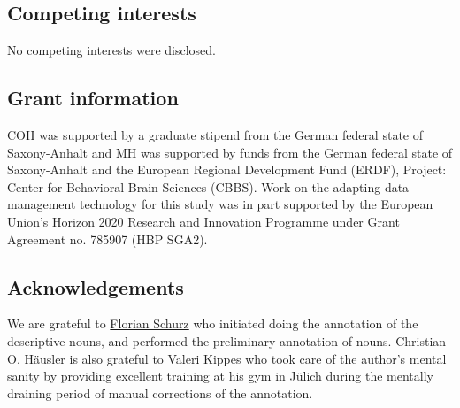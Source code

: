 \documentclass[10pt,a4paper,onecolumn]{article}
\begin{document}
\subsection*{Competing interests}
No competing interests were disclosed.

\subsection*{Grant information}

COH was supported by a graduate stipend from the German federal state of
Saxony-Anhalt and MH was supported by funds from the German federal state of
Saxony-Anhalt and the European Regional Development Fund (ERDF), Project:
Center for Behavioral Brain Sciences (CBBS). Work on the adapting data
management technology for this study was in part supported by the European
Union’s Horizon 2020 Research and Innovation Programme under Grant Agreement
no. 785907 (HBP SGA2).


\subsection*{Acknowledgements}
We are grateful to \href{www.florianschurz.de}{Florian Schurz} who initiated doing the annotation of the descriptive nouns, and performed the preliminary annotation of nouns. Christian O. Häusler is also grateful to Valeri Kippes who took care of the author's mental sanity by providing excellent training at his gym in Jülich during the mentally draining period of manual corrections of the annotation.

{\small
}
\end{document}
